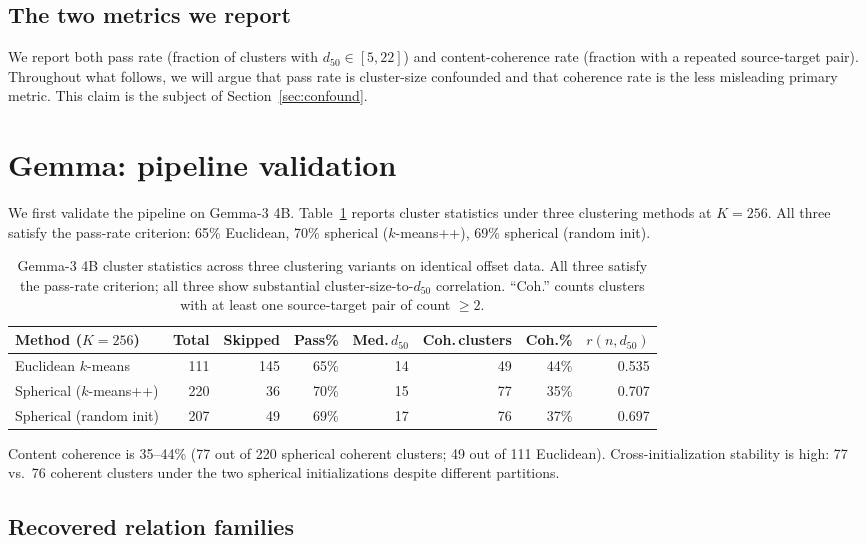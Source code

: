 \documentclass[11pt,letterpaper]{article}
\begin{document}
\subsection{The two metrics we report}

We report both pass rate (fraction of clusters with $d_{50} \in [5, 22]$) and content-coherence rate (fraction with a repeated source-target pair). Throughout what follows, we will argue that pass rate is cluster-size confounded and that coherence rate is the less misleading primary metric. This claim is the subject of Section~\ref{sec:confound}.

\section{Gemma: pipeline validation}
\label{sec:gemma}

We first validate the pipeline on Gemma-3 4B. Table~\ref{tab:gemma} reports cluster statistics under three clustering methods at $K = 256$. All three satisfy the pass-rate criterion: 65\% Euclidean, 70\% spherical ($k$-means++), 69\% spherical (random init).

\begin{table}[ht]
\centering
\small
\begin{tabular}{lrrrrrrr}
\toprule
Method ($K=256$) & Total & Skipped & Pass\% & Med.\,$d_{50}$ & Coh.\,clusters & Coh.\% & $r(n, d_{50})$ \\
\midrule
Euclidean $k$-means          & 111 & 145 & 65\% & 14 & 49 & 44\% & 0.535 \\
Spherical ($k$-means++)      & 220 &  36 & 70\% & 15 & 77 & 35\% & 0.707 \\
Spherical (random init)      & 207 &  49 & 69\% & 17 & 76 & 37\% & 0.697 \\
\bottomrule
\end{tabular}
\caption{Gemma-3 4B cluster statistics across three clustering variants on identical offset data. All three satisfy the pass-rate criterion; all three show substantial cluster-size-to-$d_{50}$ correlation. ``Coh.'' counts clusters with at least one source-target pair of count $\geq 2$.}
\label{tab:gemma}
\end{table}

Content coherence is 35--44\% (77 out of 220 spherical coherent clusters; 49 out of 111 Euclidean). Cross-initialization stability is high: 77 vs.\ 76 coherent clusters under the two spherical initializations despite different partitions.

\subsection{Recovered relation families}
\end{document}
